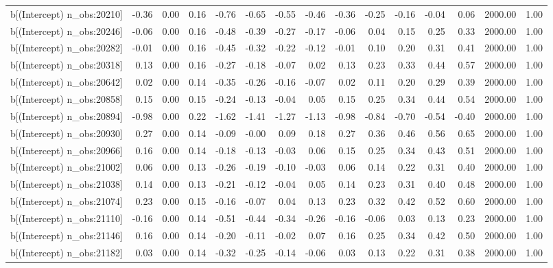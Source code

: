 \begin{table}[ht]
\begin{tabular}{rrrrrrrrrrrrrrr}
  b[(Intercept) n\_obs:20210] & -0.36 & 0.00 & 0.16 & -0.76 & -0.65 & -0.55 & -0.46 & -0.36 & -0.25 & -0.16 & -0.04 & 0.06 & 2000.00 & 1.00 \\ 
  b[(Intercept) n\_obs:20246] & -0.06 & 0.00 & 0.16 & -0.48 & -0.39 & -0.27 & -0.17 & -0.06 & 0.04 & 0.15 & 0.25 & 0.33 & 2000.00 & 1.00 \\ 
  b[(Intercept) n\_obs:20282] & -0.01 & 0.00 & 0.16 & -0.45 & -0.32 & -0.22 & -0.12 & -0.01 & 0.10 & 0.20 & 0.31 & 0.41 & 2000.00 & 1.00 \\ 
  b[(Intercept) n\_obs:20318] & 0.13 & 0.00 & 0.16 & -0.27 & -0.18 & -0.07 & 0.02 & 0.13 & 0.23 & 0.33 & 0.44 & 0.57 & 2000.00 & 1.00 \\ 
  b[(Intercept) n\_obs:20642] & 0.02 & 0.00 & 0.14 & -0.35 & -0.26 & -0.16 & -0.07 & 0.02 & 0.11 & 0.20 & 0.29 & 0.39 & 2000.00 & 1.00 \\ 
  b[(Intercept) n\_obs:20858] & 0.15 & 0.00 & 0.15 & -0.24 & -0.13 & -0.04 & 0.05 & 0.15 & 0.25 & 0.34 & 0.44 & 0.54 & 2000.00 & 1.00 \\ 
  b[(Intercept) n\_obs:20894] & -0.98 & 0.00 & 0.22 & -1.62 & -1.41 & -1.27 & -1.13 & -0.98 & -0.84 & -0.70 & -0.54 & -0.40 & 2000.00 & 1.00 \\ 
  b[(Intercept) n\_obs:20930] & 0.27 & 0.00 & 0.14 & -0.09 & -0.00 & 0.09 & 0.18 & 0.27 & 0.36 & 0.46 & 0.56 & 0.65 & 2000.00 & 1.00 \\ 
  b[(Intercept) n\_obs:20966] & 0.16 & 0.00 & 0.14 & -0.18 & -0.13 & -0.03 & 0.06 & 0.15 & 0.25 & 0.34 & 0.43 & 0.51 & 2000.00 & 1.00 \\ 
  b[(Intercept) n\_obs:21002] & 0.06 & 0.00 & 0.13 & -0.26 & -0.19 & -0.10 & -0.03 & 0.06 & 0.14 & 0.22 & 0.31 & 0.40 & 2000.00 & 1.00 \\ 
  b[(Intercept) n\_obs:21038] & 0.14 & 0.00 & 0.13 & -0.21 & -0.12 & -0.04 & 0.05 & 0.14 & 0.23 & 0.31 & 0.40 & 0.48 & 2000.00 & 1.00 \\ 
  b[(Intercept) n\_obs:21074] & 0.23 & 0.00 & 0.15 & -0.16 & -0.07 & 0.04 & 0.13 & 0.23 & 0.32 & 0.42 & 0.52 & 0.60 & 2000.00 & 1.00 \\ 
  b[(Intercept) n\_obs:21110] & -0.16 & 0.00 & 0.14 & -0.51 & -0.44 & -0.34 & -0.26 & -0.16 & -0.06 & 0.03 & 0.13 & 0.23 & 2000.00 & 1.00 \\ 
  b[(Intercept) n\_obs:21146] & 0.16 & 0.00 & 0.14 & -0.20 & -0.11 & -0.02 & 0.07 & 0.16 & 0.25 & 0.34 & 0.42 & 0.50 & 2000.00 & 1.00 \\ 
  b[(Intercept) n\_obs:21182] & 0.03 & 0.00 & 0.14 & -0.32 & -0.25 & -0.14 & -0.06 & 0.03 & 0.13 & 0.22 & 0.31 & 0.38 & 2000.00 & 1.00 \\ 

\end{tabular}
\end{table}
